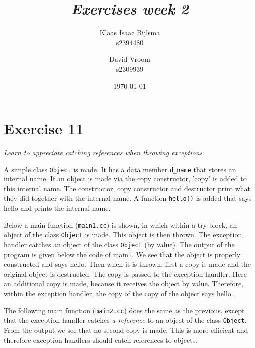 \documentclass[12pt]{article}
\title{\itshape Exercises week 2}
\author{
	Klaas Isaac Bijlsma \\ s2394480
	\and
	David Vroom \\ s2309939
}
\date{\today}
\newcommand{\desc}[1]{\textit{#1} \vspace{1em}}
\begin{document}
\maketitle

\section*{Exercise 11}
\desc{Learn to appreciate catching references when throwing exceptions}

A simple class \texttt{Object} is made. It has a data member \texttt{d\_name} that stores an internal name. If an object is made via the copy constructor, 'copy' is added to this internal name. The constructor, copy constructor and destructor print what they did together with the internal name. A function \texttt{hello()} is added that says hello and prints the internal name. 







\vspace{0.5cm}
Below a main function (\texttt{main1.cc}) is shown, in which within a try block, an object of the class \texttt{Object} is made. This object is then thrown. The exception handler catches an object of the class \texttt{Object} (by value). The output of the program is given below the code of main1. We see that the object is properly constructed and says hello. Then when it is thrown, first a copy is made and the original object is destructed. The copy is passed to the exception handler. Here an additional copy is made, because it receives the object by value. Therefore, within the exception handler, the copy of the copy of the object says hello.



\vspace{0.5cm}
The following main function (\texttt{main2.cc}) does the same as the previous, except that the exception handler catches \emph{a reference} to an object of the class \texttt{Object}. From the output we see that no second copy is made. This is more efficient and therefore exception handlers should catch references to objects. 


\end{document}
